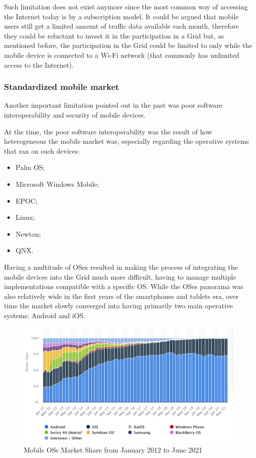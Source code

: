 Such limitation does not exist anymore since the most common way of accessing the Internet today is by a subscription model. It could be argued that mobile users still get a limited amount of traffic data available each month, therefore they could be reluctant to invest it in the participation in a Grid but, as mentioned before, the participation in the Grid could be limited to only while the mobile device is connected to a Wi-Fi network (that commonly has unlimited access to the Internet).

\subsubsection{Standardized mobile market}
Another important limitation pointed out in the past was poor software interoperability and security of 
mobile devices.

At the time, the poor software interoperability was the result of how heterogeneous the mobile market was, especially regarding the operative systems that ran on such devices:
\begin{itemize}
    \item Palm OS;
    \item Microsoft Windows Mobile;
    \item EPOC;
    \item Linux;
    \item Newton;
    \item QNX.
\end{itemize}
Having a multitude of OSes resulted in making the process of integrating the mobile devices into the Grid much more difficult, having to manage multiple implementations compatible with a specific OS. While the OSes panorama was also relatively wide in the first years of the smartphones and tablets era, over time the market slowly converged into having primarily two main operative systems: Android and iOS.

\begin{figure}[!ht]
    \centering
    \includegraphics[scale=0.31]{document/chapters/chapter_1/images/os_market_share_2012_to_2021.png}
    \caption{Mobile OSs Market Share from January 2012 to June 2021 \cite{mobile_and_desktop_os_market}}
    \label{fig:os_market_share_2012_to_2021}
\end{figure}


